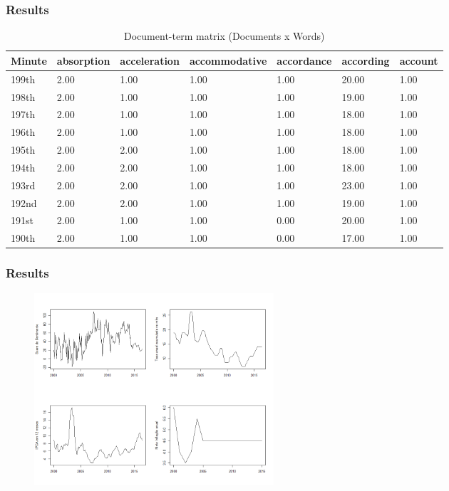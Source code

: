 \documentclass[aspectratio=169]{beamer}
\begin{document}
\begin{frame}\frametitle{Results}
  \begin{table}[h!]
  \centering
  \caption{Document-term matrix (Documents x Words)}
  \begin{tabular}{@{}lllllll@{}}
  \toprule
  Minute & absorption & acceleration & accommodative & accordance & according & account \\ 
  \midrule
  199th & 2.00 & 1.00 & 1.00 & 1.00 & 20.00 & 1.00 \\ 
  198th & 2.00 & 1.00 & 1.00 & 1.00 & 19.00 & 1.00 \\ 
  197th & 2.00 & 1.00 & 1.00 & 1.00 & 18.00 & 1.00 \\ 
  196th & 2.00 & 1.00 & 1.00 & 1.00 & 18.00 & 1.00 \\ 
  195th & 2.00 & 2.00 & 1.00 & 1.00 & 18.00 & 1.00 \\ 
  194th & 2.00 & 2.00 & 1.00 & 1.00 & 18.00 & 1.00 \\ 
  193rd & 2.00 & 2.00 & 1.00 & 1.00 & 23.00 & 1.00 \\ 
  192nd & 2.00 & 2.00 & 1.00 & 1.00 & 19.00 & 1.00 \\ 
  191st & 2.00 & 1.00 & 1.00 & 0.00 & 20.00 & 1.00 \\ 
  190th & 2.00 & 1.00 & 1.00 & 0.00 & 17.00 & 1.00 \\ 
  \bottomrule
  \end{tabular}
  \end{table}
\end{frame}

\begin{frame}\frametitle{Results}
  \begin{figure}[hb]
  \includegraphics[width=3.5in]{comparative.png}
  \end{figure}
\end{frame}
\end{document}
